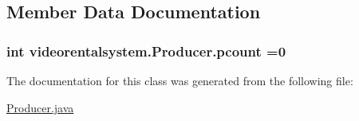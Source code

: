 \subsection{Member Data Documentation}
\hypertarget{classvideorentalsystem_1_1Producer_af9cea6d53da66d2161104a631a34f093}{
\subsubsection[{pcount}]{\setlength{\rightskip}{0pt plus 5cm}int videorentalsystem.\-Producer.\-pcount =0\hspace{0.3cm}{\ttfamily [static]}}}\label{classvideorentalsystem_1_1Producer_af9cea6d53da66d2161104a631a34f093}


The documentation for this class was generated from the following file\-:\begin{DoxyCompactItemize}
\item 
\hyperlink{Producer_8java}{Producer.\-java}\end{DoxyCompactItemize}
